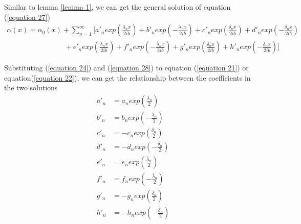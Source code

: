 \documentclass[a4paper]{article}      %
\begin{document}
Similar to lemma \ref{lemma 1}, we can get the general solution of equation (\ref{equation 27})
    \begin{equation}\label{equation 28}                                     %
       \begin{array}{l}
        \alpha (x) = {\alpha_0}(x) + \sum\limits_{n = 1}^\infty  {[{a'_n}exp(\frac{{{\lambda _n}x}}{{2ib}}) + {b'_n}exp( - \frac{{{\lambda _n}x}}{{2ib}}) + {c'_n}exp(\frac{{{\delta _n}x}}{{2ib}}) + {d'_n}exp( - \frac{{{\delta _n}x}}{{2ib}})} \\
        \qquad\qquad \qquad \qquad +{e'_n}exp(\frac{{{{\bar \lambda }_n}x}}{{2ib}}) + {f'_n}exp( - \frac{{{{\bar \lambda }_n}x}}{{2ib}}) + {g'_n}exp(\frac{{{{\bar \delta }_n}x}}{{2ib}}) + {h'_n}exp( - \frac{{{{\bar \delta }_n}x}}{{2ib}})]
        \end{array}
    \end{equation}

Substituting (\ref{equation 24}) and (\ref{equation 28}) to equation (\ref{equation 21}) or equation(\ref{equation 22}), we can get the relationship between the coefficients in the two solutions
    \begin{equation}\label{equation 29}                                     %
    \begin{split}
    a'_n&=a_n exp(\frac{\lambda_n}{2})\\
    b'_n&=b_n exp(-\frac{\lambda_n}{2})\\
    c'_n&=-c_n exp(\frac{\delta_n}{2})\\
    d'_n&=-d_n exp(-\frac{\delta_n}{2})\\
    e'_n&=e_n exp(\frac{\bar \lambda_n}{2})\\
    f'_n&=f_n exp(-\frac{\bar \lambda_n}{2})\\
    g'_n&=-g_n exp(\frac{\bar \delta_n}{2})\\
    h'_n&=-h_n exp(-\frac{\bar \delta_n}{2})\\
    \end{split}
    \end{equation}
\end{document}

